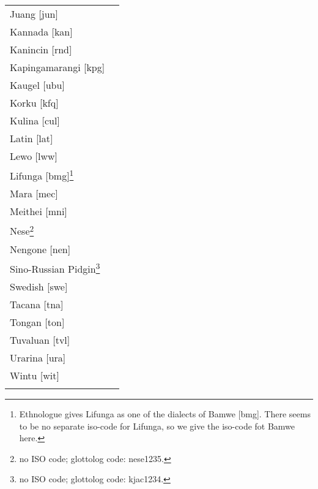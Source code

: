 ﻿\documentclass[output=paper]{langsci/langscibook}
\begin{document}
\begin{tabularx}{.45\textwidth}{ l Q }
Juang [jun]\\
Kannada [kan]\\
Kanincin [rnd]\\
Kapingamarangi [kpg]\\
Kaugel [ubu]\\
Korku [kfq]\\
Kulina [cul]\\
Latin [lat]\\
Lewo [lww]\\
Lifunga [bmg]\footnote{Ethnologue gives Lifunga as one of the dialects of
Bamwe [bmg]. There seems to be no separate iso-code for Lifunga, so we give
the iso-code fot Bamwe here.}\\
Mara [mec]\\
Meithei [mni]\\
Nese\footnote{no ISO code; glottolog code: nese1235.}\\
Nengone [nen]\\
Sino-Russian Pidgin\footnote{no ISO code; glottolog code: kjac1234.}\\
Swedish [swe]\\
Tacana [tna]\\
Tongan [ton]\\
Tuvaluan [tvl]\\
Urarina [ura]\\
Wintu [wit]\\
\\
\end{tabularx}

\printbibliography[heading=subbibliography,notcategory=online]
\printbibliography[heading=subbibliography,category=online,title={Sources}]
\end{document}

